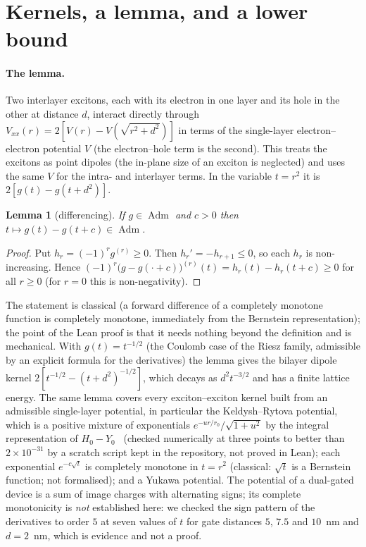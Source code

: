 \documentclass[11pt,a4paper]{article}
\newtheorem{lemma}{Lemma}
\DeclareMathOperator{\Adm}{Adm}
\begin{document}
\section{Kernels, a lemma, and a lower bound}\label{sec:kernels}

\paragraph{The lemma.} Two interlayer excitons, each with its electron in one layer and its hole in the other at distance $d$,
interact directly through $V_{xx}(r)=2[V(r)-V(\sqrt{r^2+d^2})]$ in terms of the single-layer electron--electron potential $V$
(the electron--hole term is the second). This treats the excitons as point dipoles (the in-plane size of an exciton is neglected) and uses the
same $V$ for the intra- and interlayer terms. In the variable $t=r^2$ it is $2[g(t)-g(t+d^2)]$.

\begin{lemma}[differencing]\label{lem:diff}
If $g\in\Adm$ and $c>0$ then $t\mapsto g(t)-g(t+c)\in\Adm$.
\end{lemma}
\begin{proof}
Put $h_r=(-1)^rg^{(r)}\ge0$. Then $h_r'=-h_{r+1}\le0$, so each $h_r$ is non-increasing. Hence
$(-1)^r\big(g-g(\cdot+c)\big)^{(r)}(t)=h_r(t)-h_r(t+c)\ge0$ for all $r\ge0$ (for $r=0$ this is non-negativity).
\end{proof}

The statement is classical (a forward difference of a completely monotone function is completely monotone, immediately from
the Bernstein representation); the point of the Lean proof is that it needs nothing beyond the definition and is mechanical. With $g(t)=t^{-1/2}$ (the Coulomb case of the Riesz family, admissible by an explicit formula for the
derivatives) the lemma gives the bilayer dipole kernel $2[t^{-1/2}-(t+d^2)^{-1/2}]$, which decays as $d^2t^{-3/2}$ and has a finite lattice
energy. The same lemma covers every exciton--exciton kernel built from an admissible single-layer potential, in particular the
Keldysh--Rytova potential, which is a positive mixture of exponentials $e^{-ur/r_0}/\sqrt{1+u^2}$ by the integral representation
of $H_0-Y_0$~\cite{DLMF} (checked numerically at three points to better than $2\times10^{-31}$ by a scratch script kept in the
repository, not proved in Lean); each exponential $e^{-c\sqrt t}$ is completely monotone in $t=r^2$ (classical: $\sqrt t$ is a Bernstein
function; not formalised); and a Yukawa potential. The potential of a dual-gated device is a sum of image charges with alternating signs; its complete monotonicity
is \emph{not} established here: we checked the sign pattern of the derivatives to order $5$ at seven values of $t$ for gate
distances $5$, $7.5$ and $10$~nm and $d=2$~nm, which is evidence and not a proof.
\end{document}
